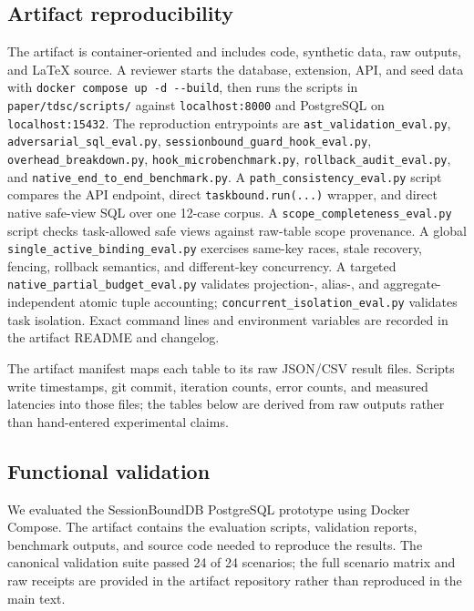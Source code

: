 \documentclass[journal]{IEEEtran}
\begin{document}
\hypertarget{artifact-reproducibility}{%
\subsection{Artifact reproducibility}\label{artifact-reproducibility}}

The artifact is container-oriented and includes code, synthetic data,
raw outputs, and LaTeX source. A reviewer starts the database,
extension, API, and seed data with
\verb|docker compose up -d --build|, then runs the scripts in
\texttt{paper/tdsc/scripts/} against
\texttt{localhost:8000} and PostgreSQL on \texttt{localhost:15432}. The
reproduction entrypoints are \texttt{ast\_validation\_eval.py},
\texttt{adversarial\_sql\_eval.py},
\texttt{sessionbound\_guard\_hook\_eval.py},
\texttt{overhead\_breakdown.py}, \texttt{hook\_microbenchmark.py},
\texttt{rollback\_audit\_eval.py}, and
\texttt{native\_end\_to\_end\_benchmark.py}. A
\texttt{path\_consistency\_eval.py} script compares the API endpoint,
direct \texttt{taskbound.run(...)} wrapper, and direct native safe-view
SQL over one 12-case corpus. A
\texttt{scope\_completeness\_eval.py} script checks task-allowed safe
views against raw-table scope provenance. A global
\texttt{single\_active\_binding\_eval.py} exercises same-key races,
stale recovery, fencing, rollback semantics, and different-key
concurrency. A targeted
\texttt{native\_partial\_budget\_eval.py} validates projection-, alias-,
and aggregate-independent atomic tuple accounting; \texttt{concurrent\_isolation\_eval.py} validates
task isolation. Exact command lines and
environment variables are recorded in the artifact README and changelog.

The artifact manifest maps each table to its raw JSON/CSV result files.
Scripts write timestamps, git commit, iteration counts, error counts,
and measured latencies into those files; the tables below are derived
from raw outputs rather than hand-entered experimental claims.

\hypertarget{functional-validation}{%
\subsection{Functional validation}\label{functional-validation}}

We evaluated the SessionBoundDB PostgreSQL prototype using Docker
Compose. The artifact contains the evaluation scripts, validation
reports, benchmark outputs, and source code needed to reproduce the
results. The canonical validation suite passed 24 of 24
scenarios; the full scenario matrix and raw receipts are provided in the
artifact repository rather than reproduced in the main text.
\end{document}

